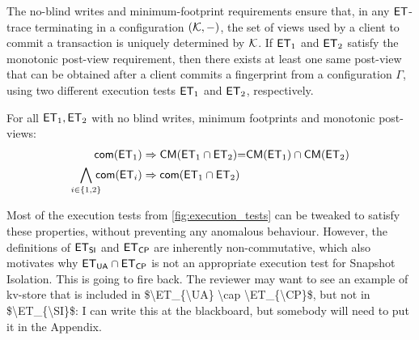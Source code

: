 The no-blind writes and minimum-footprint requirements ensure that, in any $\mathsf{ET}$-trace 
terminating in a configuration $(\mathcal{K}, -)$, 
the set of views used by a client to commit a transaction is uniquely determined by $\mathcal{K}$. 
If $\mathsf{ET}_1$ and $\mathsf{ET}_2$ satisfy the monotonic post-view requirement, then there exists at least one  same post-view 
that can be obtained after a client commits a fingerprint from a configuration $\Gamma$, 
using two different execution tests $\mathsf{ET}_1$ and $\mathsf{ET}_2$, respectively. 

\begin{theorem}[Compositionality]     
For all $\mathsf{ET}_1, \mathsf{ET}_2$ with no blind writes, minimum footprints and monotonic post-views: 
\begin{align*}
	\mathsf{com}(\mathsf{ET}_1)
	& \Rightarrow \mathsf{CM}(\mathsf{ET}_1 \cap \mathsf{ET}_2) {=} \mathsf{CM}(\mathsf{ET}_1) \cap \mathsf{CM}(\mathsf{ET}_2)\\
	\bigwedge_{i \in \{1, 2\}} \!\!\!\!\mathsf{com}(\mathsf{ET}_i)
	& \Rightarrow  \mathsf{com}(\mathsf{ET}_1 \cap \mathsf{ET}_2)
\end{align*}
\end{theorem}
Most of the execution tests from \cref{fig:execution_tests} can be tweaked to satisfy these 
properties, without preventing any anomalous behaviour. However, the definitions 
of $\ET_{\SI}$ and $\mathsf{ET}_{\mathsf{CP}}$ are inherently non-commutative, which also motivates 
why $\ET_{\UA} \cap \ET_{\CP}$ is not an appropriate execution test for Snapshot Isolation.
\ac{This is going to fire back. The reviewer may want to 
see an example of kv-store that is included in $\ET_{\UA} \cap \ET_{\CP}$, but not in 
$\ET_{\SI}$: I can write this at the blackboard, but somebody will need to put it in the Appendix.}


